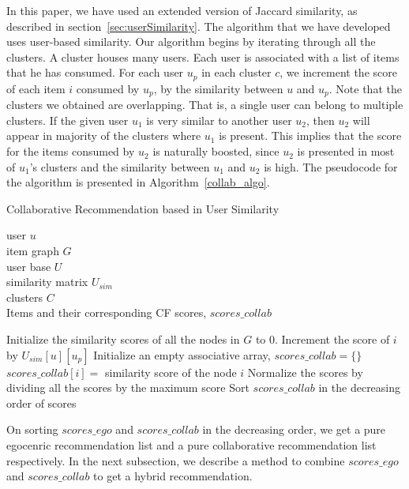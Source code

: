 \documentclass{acm_proc_article-sp}
\begin{document}
In this paper, we have used an extended version of Jaccard similarity, as described in section~\ref{sec:userSimilarity}. The algorithm that we have developed uses user-based similarity. Our algorithm begins by iterating through all the clusters. A cluster houses many users. Each user is associated with a list of items that he has consumed. For each user $u_p$ in each cluster $c$, we increment the score of each item $i$ consumed by $u_p$, by the similarity between $u$ and $u_p$. Note that the clusters we obtained are overlapping. That is, a single user can belong to multiple clusters. If the given user $u_1$ is very similar to another user $u_2$, then $u_2$ will appear in majority of the clusters where $u_1$ is present. This implies that the score for the items consumed by $u_2$ is naturally boosted, since $u_2$ is presented in most of $u_1$'s clusters and the similarity between $u_1$ and $u_2$ is high. The pseudocode for the algorithm is presented in Algorithm~\ref{collab_algo}.

\begin{algorithm}
\label{collab_algo}
\caption{Collaborative Recommendation based in User Similarity}
\begin{algorithmic}[1]
\renewcommand{\algorithmicrequire}{\textbf{Input:}}
\renewcommand{\algorithmicensure}{\textbf{Output:}}

\REQUIRE user $u$\\
item graph $G$\\
user base $U$\\
similarity matrix $U_{sim}$\\
clusters $C$\\
\ENSURE Items and their corresponding CF scores, $scores\_collab$

\STATE Initialize the similarity scores of all the nodes in $G$ to 0.
      \STATE Increment the score of $i$ by $U_{sim}[u][u_p]$
    \ENDFOR
  \ENDFOR
\ENDFOR
\STATE Initialize an empty associative array, $scores\_collab = \{ \}$ 
  \STATE $scores\_collab[i] =$ similarity score of the node $i$
\ENDFOR
\STATE Normalize the scores by dividing all the scores by the maximum score
\STATE Sort $scores\_collab$ in the decreasing order of scores
\end{algorithmic}
\end{algorithm}

On sorting $scores\_ego$ and $scores\_collab$ in the decreasing order, we get a pure egocenric recommendation list and a pure collaborative recommendation list respectively. In the next subsection, we describe a method to combine $scores\_ego$ and $scores\_collab$ to get a hybrid recommendation.
\end{document}
